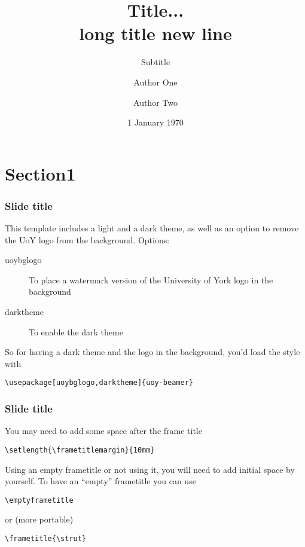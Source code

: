 \documentclass[t,compress,aspectratio=169]{beamer}
\title[Short title]{Title... \\ long title new line}
\subtitle{Subtitle}
\author[Short author(s)]{Author One\inst{1,2} \and Author Two\inst{2}}
\institute{\inst{1}University of York \\ \inst{2}Another Affiliation}
\date[1 Jan]{1 January 1970}
\begin{document}
\begin{frame}[plain]
\maketitle
\end{frame}


\begin{frame}
\tableofcontents
\end{frame}



\section{Section1}
\begin{frame}[fragile]
\frametitle{Slide title}
This template includes a light and a dark theme, as well as an option to remove the UoY logo from the background. Options:
\begin{description}
  \item[uoybglogo] To place a watermark version of the University of York logo in the background
  \item[darktheme] To enable the dark theme
\end{description}
So for having a dark theme and the logo in the background, you'd load the style with
\begin{lstlisting}
\usepackage[uoybglogo,darktheme]{uoy-beamer}
\end{lstlisting}
\end{frame}

\begin{frame}[fragile]
\frametitle{Slide title}
You may need to add some space after the frame title
\begin{lstlisting}
\setlength{\frametitlemargin}{10mm}
\end{lstlisting}

\pause
\vskip 3mm
Using an empty frametitle or not using it, you will need to add initial space by yourself.
To have an ``empty'' frametitle you can use
\begin{lstlisting}
\emptyframetitle
\end{lstlisting}

\pause
or (more portable)
\begin{lstlisting}
\frametitle{\strut}
\end{lstlisting}
\end{frame}
\end{document}
